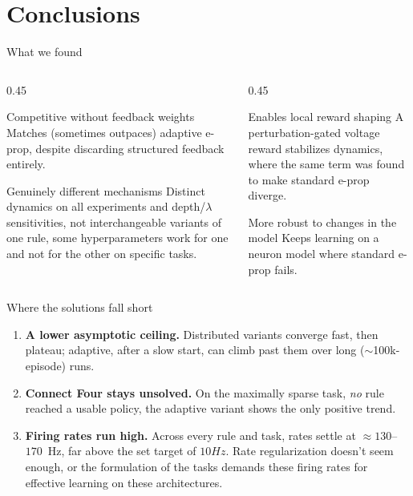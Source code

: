 \documentclass[aspectratio=169,11pt]{beamer}
\begin{document}
\section{Conclusions}

\begin{frame}{What we found}
  \begin{columns}[T]
    \begin{column}{0.45\textwidth}
      \begin{block}{Competitive without feedback weights}
        Matches (sometimes outpaces) adaptive e-prop, despite discarding
        structured feedback entirely.
      \end{block}
      \begin{block}{Genuinely different mechanisms}
        Distinct dynamics on all experiments and depth/$\lambda$ sensitivities, not
        interchangeable variants of one rule, some hyperparameters work for one and not for the other on specific tasks.
      \end{block}
    \end{column}
    \begin{column}{0.45\textwidth}
      \begin{block}{Enables local reward shaping}
        A perturbation-gated voltage reward stabilizes dynamics, where the
        same term was found to make standard e-prop diverge.
      \end{block}
      \begin{block}{More robust to changes in the model}
        Keeps learning on a neuron model where standard e-prop fails.
      \end{block}
    \end{column}
  \end{columns}
\end{frame}

\begin{frame}{Where the solutions fall short}
  \begin{enumerate}
    \item \textbf{A lower asymptotic ceiling.} Distributed variants converge
          fast, then plateau; adaptive, after a slow start, can climb past them
          over long ($\sim$100k-episode) runs.
    \item \textbf{Connect Four stays unsolved.} On the maximally sparse task,
          \emph{no} rule reached a usable policy, the adaptive variant shows the only
          positive trend.
    \item \textbf{Firing rates run high.} Across every rule and task, rates
          settle at $\approx 130$–$170$~Hz, far above the set target of
          $10Hz$. Rate regularization doesn't seem enough, or the formulation of the tasks demands these firing rates for effective learning on these architectures.
  \end{enumerate}
\end{frame}
\end{document}

